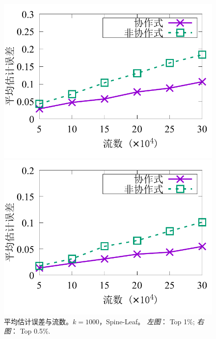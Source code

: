 \begin{figure}[ht]
	\centering
	\begin{minipage}[t]{0.49\linewidth}
		\centering
		\includegraphics[width=\linewidth]{fig/half_eg_099_flow.pdf}
	\end{minipage}\vspace{-0.6em}%
	\begin{minipage}[t]{0.49\linewidth}
		\centering
		\includegraphics[width=\linewidth]{fig/half_eg_095_flow.pdf}
	\end{minipage}\vspace{-0.6em}%
	\caption{\textnormal{平均估计误差与流数。$k=1000$，Spine-Leaf。 \textit{左图}： Top 1\%; \textit{右图}： Top 0.5\%.}}
	\label{fig:coop,acc,flow}
\end{figure}


